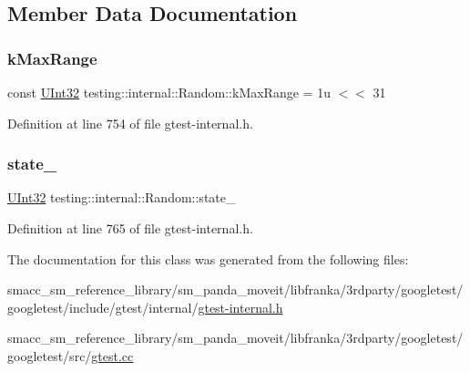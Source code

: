 \subsection{Member Data Documentation}
\mbox{\label{classtesting_1_1internal_1_1Random_a36d72dd7063d0b5338f229e75382fdd2}} 
\subsubsection{\texorpdfstring{k\+Max\+Range}{kMaxRange}}
{\footnotesize\ttfamily const \hyperlink{namespacetesting_1_1internal_a40d4fffcd2bf56f18b1c380615aa85e3}{U\+Int32} testing\+::internal\+::\+Random\+::k\+Max\+Range = 1u $<$$<$ 31\hspace{0.3cm}{\ttfamily [static]}}



Definition at line 754 of file gtest-\/internal.\+h.

\mbox{\label{classtesting_1_1internal_1_1Random_ad500e33e3342415afb8a3ab242afa9cc}} 
\subsubsection{\texorpdfstring{state\+\_\+}{state\_}}
{\footnotesize\ttfamily \hyperlink{namespacetesting_1_1internal_a40d4fffcd2bf56f18b1c380615aa85e3}{U\+Int32} testing\+::internal\+::\+Random\+::state\+\_\+\hspace{0.3cm}{\ttfamily [private]}}



Definition at line 765 of file gtest-\/internal.\+h.



The documentation for this class was generated from the following files\+:\begin{DoxyCompactItemize}
\item 
smacc\+\_\+sm\+\_\+reference\+\_\+library/sm\+\_\+panda\+\_\+moveit/libfranka/3rdparty/googletest/googletest/include/gtest/internal/\hyperlink{gtest-internal_8h}{gtest-\/internal.\+h}\item 
smacc\+\_\+sm\+\_\+reference\+\_\+library/sm\+\_\+panda\+\_\+moveit/libfranka/3rdparty/googletest/googletest/src/\hyperlink{gtest_8cc}{gtest.\+cc}\end{DoxyCompactItemize}
